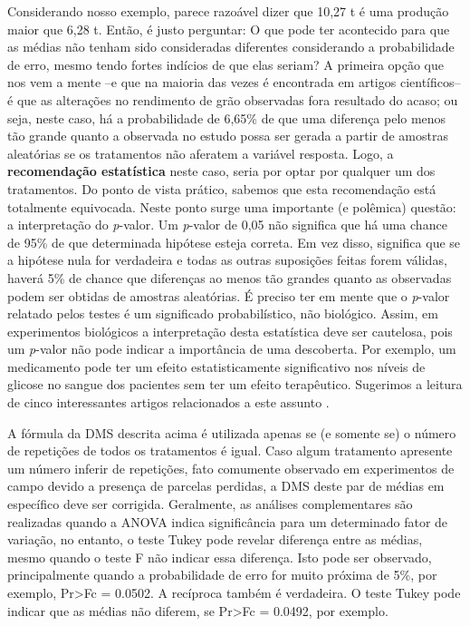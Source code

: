 \documentclass[
]{book}
\begin{document}
Considerando nosso exemplo, parece razoável dizer que 10,27 t é uma produção maior que 6,28 t. Então, é justo perguntar: O que pode ter acontecido para que as médias não tenham sido consideradas diferentes considerando a probabilidade de erro, mesmo tendo fortes indícios de que elas seriam? A primeira opção que nos vem a mente --e que na maioria das vezes é encontrada em artigos científicos-- é que as alterações no rendimento de grão observadas fora resultado do acaso; ou seja, neste caso, há a probabilidade de 6,65\% de que uma diferença pelo menos tão grande quanto a observada no estudo possa ser gerada a partir de amostras aleatórias se os tratamentos não aferatem a variável resposta. Logo, a \textbf{recomendação estatística} neste caso, seria por optar por qualquer um dos tratamentos. Do ponto de vista prático, sabemos que esta recomendação está totalmente equivocada. Neste ponto surge uma importante (e polêmica) questão: a interpretação do \emph{p}-valor. Um \emph{p}-valor de 0,05 não significa que há uma chance de 95\% de que determinada hipótese esteja correta. Em vez disso, significa que se a hipótese nula for verdadeira e todas as outras suposições feitas forem válidas, haverá 5\% de chance que diferenças ao menos tão grandes quanto as observadas podem ser obtidas de amostras aleatórias. É preciso ter em mente que o \emph{p}-valor relatado pelos testes é um significado probabilístico, não biológico. Assim, em experimentos biológicos a interpretação desta estatística deve ser cautelosa, pois um \emph{p}-valor não pode indicar a importância de uma descoberta. Por exemplo, um medicamento pode ter um efeito estatisticamente significativo nos níveis de glicose no sangue dos pacientes sem ter um efeito terapêutico. Sugerimos a leitura de cinco interessantes artigos relacionados a este assunto \citep{Altman2017, Baker2016, Chawla2017, Krzywinski2013, Nuzzo2014}.

\begin{vcsabia}
A fórmula da DMS descrita acima é utilizada apenas se (e somente se) o número de repetições de todos os tratamentos é igual. Caso algum tratamento apresente um número inferir de repetições, fato comumente observado em experimentos de campo devido a presença de parcelas perdidas, a DMS deste par de médias em específico deve ser corrigida. Geralmente, as análises complementares são realizadas quando a ANOVA indica significância para um determinado fator de variação, no entanto, o teste Tukey pode revelar diferença entre as médias, mesmo quando o teste F não indicar essa diferença. Isto pode ser observado, principalmente quando a probabilidade de erro for muito próxima de 5\%, por exemplo, Pr\textgreater Fc = 0.0502. A recíproca também é verdadeira. O teste Tukey pode indicar que as médias não diferem, se Pr\textgreater Fc = 0.0492, por exemplo.
\end{vcsabia}
\end{document}
